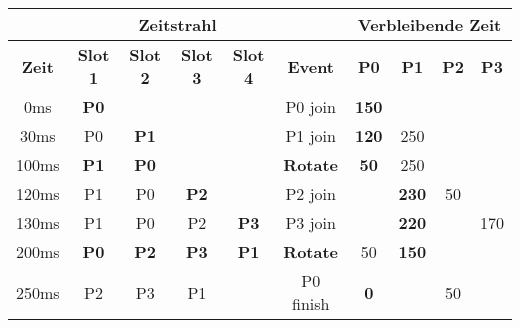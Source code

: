 \documentclass{article}
\begin{document}
\begin{table}[!h]
    \centering
    \begin{tabular}{c|cccc|c|cccc}
        \multicolumn{6}{c}{\textbf{Zeitstrahl}} & \multicolumn{4}{|c}{\textbf{Verbleibende Zeit}}                                                                                                                                   \\ \hline
        \textbf{Zeit}                           & \textbf{Slot 1}                                 & \textbf{Slot 2} & \textbf{Slot 3} & \textbf{Slot 4} & \textbf{Event}  & \textbf{P0}  & \textbf{P1}  & \textbf{P2} & \textbf{P3} \\ \hline
        0ms                                     & \textbf{P0}                                     &                 &                 &                 & P0 join         & \textbf{150} &              &             &             \\
        30ms                                    & P0                                              & \textbf{P1}     &                 &                 & P1 join         & \textbf{120} & 250          &             &             \\
        100ms                                   & \textbf{P1}                                     & \textbf{P0}     &                 &                 & \textbf{Rotate} & \textbf{50}  & 250          &             &             \\
        120ms                                   & P1                                              & P0              & \textbf{P2}     &                 & P2 join         &              & \textbf{230} & 50          &             \\
        130ms                                   & P1                                              & P0              & P2              & \textbf{P3}     & P3 join         &              & \textbf{220} &             & 170         \\
        200ms                                   & \textbf{P0}                                     & \textbf{P2}     & \textbf{P3}     & \textbf{P1}     & \textbf{Rotate} & 50           & \textbf{150} &             &             \\
        250ms                                   & P2                                              & P3              & P1              &                 & P0 finish       & \textbf{0}   &              & 50          &             \\

\end{tabular}
\end{table}
\end{document}
